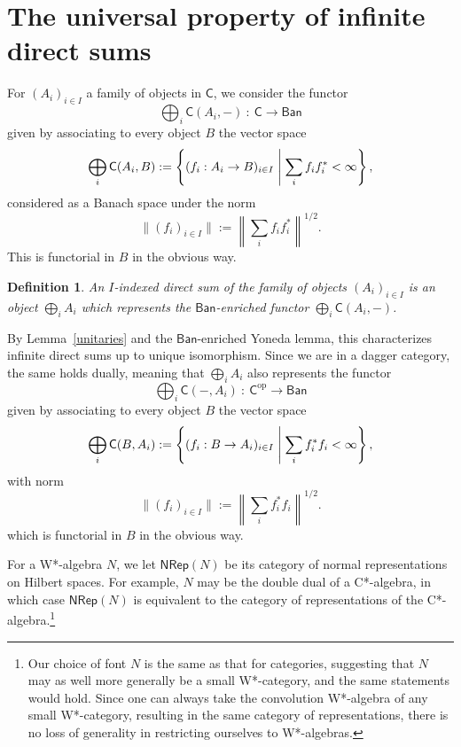 \documentclass[reqno,T1]{amsproc}
\newcommand{\op}{\mathrm{op}}
\newcommand{\cat}[1]{\mathsf{#1}}		%
\newcommand{\Ban}{\mathsf{Ban}}			%
\newcommand{\NRep}[1]{\mathsf{NRep}(#1)}	%
\theoremstyle{plain}
\newtheorem{defn}[thm]{Definition}
\theoremstyle{remark}
\numberwithin{equation}{section}
\begin{document}
\section{The universal property of infinite direct sums}

For $(A_i)_{i\in I}$ a family of objects in $\cat{C}$, we consider the functor
\[
	\bigoplus_i \cat{C}(A_i,-) \: : \: \cat{C} \to \Ban
\]
given by associating to every object $B$ the vector space
\[
	\bigoplus_i \cat{C}(A_i , B) := \left\{ (f_i : A_i \to B)_{i\in I} \Biggm\vert \sum_i f_i f_i^* < \infty \right\},
\]
considered as a Banach space under the norm
\[
	\| (f_i)_{i \in I} \| := \left\| \sum_i f_i f_i^* \right\|^{1/2}.
\]
This is functorial in $B$ in the obvious way.


\begin{defn}
\label{directsumdef}
An \emph{$I$-indexed direct sum} of the family of objects $(A_i)_{i\in I}$ is an object $\bigoplus_i A_i$ which represents the $\Ban$-enriched functor $\bigoplus_i \cat{C}(A_i,-)$.
\end{defn}

By Lemma~\ref{unitaries} and the $\Ban$-enriched Yoneda lemma, this characterizes infinite direct sums up to unique isomorphism. Since we are in a dagger category, the same holds dually, meaning that $\bigoplus_i A_i$ also represents the functor
\[
	\bigoplus_i \cat{C}(-,A_i) \: : \: \cat{C}^\op \to \Ban
\]
given by associating to every object $B$ the vector space
\[
	\bigoplus_i \cat{C}(B, A_i) := \left\{ (f_i : B \to A_i)_{i\in I} \Biggm\vert \sum_i f_i^* f_i < \infty \right\},
\]
with norm
\[
	\| (f_i)_{i \in I} \| := \left\| \sum_i f_i^* f_i \right\|^{1/2}.
\]
which is functorial in $B$ in the obvious way.

\newcommand{\alg}{N}	%

For a W*-algebra $\alg$, we let $\NRep{\alg}$ be its category of normal representations on Hilbert spaces. For example, $\alg$ may be the double dual of a C*-algebra, in which case $\NRep{\alg}$ is equivalent to the category of representations of the C*-algebra.\footnote{Our choice of font $\alg$ is the same as that for categories, suggesting that $\alg$ may as well more generally be a small W*-category, and the same statements would hold. Since one can always take the convolution W*-algebra of any small W*-category, resulting in the same category of representations, there is no loss of generality in restricting ourselves to W*-algebras.}
\end{document}
